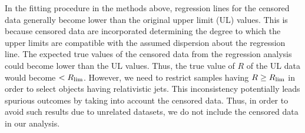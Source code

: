 \documentclass[preprint2,twocolappendix]{aastex6}
\begin{document}
In the fitting procedure in the methods above, regression lines for the censored data generally become lower than the original upper limit (UL) values. This is because censored data are incorporated determining the degree to which the upper limits are compatible with the assumed dispersion about the regression line. The expected true values of the censored data from the regression analysis could become lower than the UL values. Thus, the true value of $R$ of the UL data would become $<R_{\rm lim}$. However, we need to restrict samples having $R\geq R_{\rm lim}$ in order to select objects having relativistic jets. This inconsistency potentially leads spurious outcomes by taking into account the censored data. Thus, in order to avoid such results due to unrelated datasets, we do not include the censored data in our analysis. 
\end{document}
